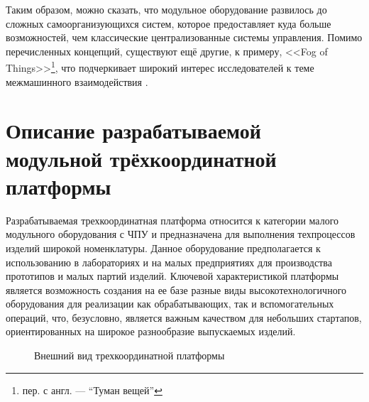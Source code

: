 Таким образом, можно сказать, что модульное оборудование развилось до сложных самоорганизующихся систем, которое предоставляет куда больше возможностей, чем классические централизованные системы управления. Помимо перечисленных концепций, существуют ещё другие, к примеру, <<Fog of Things>>\footnote{пер. с англ. --- ``Туман вещей''}, что подчеркивает широкий интерес исследователей к теме межмашинного взаимодействия \cite{Verba2016, Prazeres7471301, Alrawais2017}.

\section{Описание разрабатываемой модульной трёхкоординатной платформы} \label{sect1_5}

Разрабатываемая трехкоординатная платформа относится к категории малого модульного оборудования с ЧПУ и предназначена для выполнения техпроцессов изделий широкой номенклатуры. Данное оборудование предполагается к использованию в лабораториях и на малых предприятиях для производства прототипов и малых партий изделий. Ключевой характеристикой платформы является возможность создания на ее базе разные виды высокотехнологичного оборудования для реализации как обрабатывающих, так и вспомогательных операций, что, безусловно, является важным качеством для небольших стартапов, ориентированных на широкое разнообразие выпускаемых изделий.

\begin{figure}[ht]
	\caption{Внешний вид трехкоординатной платформы}\label{fig:table}
\end{figure}

